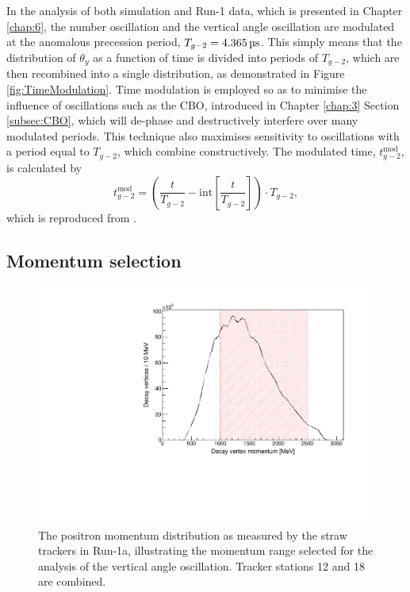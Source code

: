 In the analysis of both simulation and Run-1 data, which is presented in Chapter \ref{chap:6}, the number oscillation and the vertical angle oscillation are modulated at the anomalous precession period, $T_{g-2} = \text{\SI{4.365}{\micro\second}}$. This simply means that the distribution of $\theta_{y}$ as a function of time is divided into periods of $T_{g-2}$, which are then recombined into a single distribution, as demonstrated in Figure \ref{fig:TimeModulation}. Time modulation is employed so as to minimise the influence of oscillations such as the CBO, introduced in Chapter \ref{chap:3} Section \ref{subsec:CBO}, which will de-phase and destructively interfere over many modulated periods. This technique also maximises sensitivity to oscillations with a period equal to $T_{g-2}$, which combine constructively. The modulated time, $t_{g-2}^\text{mod}$, is calculated by 
%
\begin{equation}
  t_{g-2}^{\text{mod}} = \left(\frac{t}{T_{g-2}}-\text{int}\left[\frac{t}{T_{g-2}}\right]\right)\cdot T_{g-2},
  \label{eqn:TimeMod}
\end{equation}
%
which is reproduced from \cite{Lukicov}.

\subsection{Momentum selection}\label{subsec:MomSelect}

\begin{figure}[b!]
\centering{}
\includegraphics[trim={0 0 0 0},clip,width=.69\textwidth]{Images/Chapter5/RecoMomentum_Simultaneous.pdf}
\caption{The positron momentum distribution as measured by the straw trackers in Run-1a, illustrating the momentum range selected for the analysis of the vertical angle oscillation. Tracker stations 12 and 18 are combined.}
\label{fig:RecoMomentum_Simultaneous}
\end{figure}  

